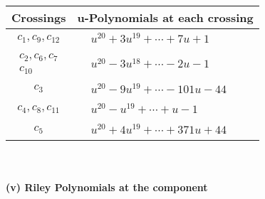 \documentclass[1p]{elsarticle_modified}
\theoremstyle{definition}
\begin{document}
\begin{tabular}{m{50pt}|m{274pt}}
Crossings & \hspace{64pt}u-Polynomials at each crossing \\
\hline $$\begin{aligned}c_{1},c_{9},c_{12}\end{aligned}$$&$\begin{aligned}
&u^{20}+3 u^{19}+\cdots+7 u+1
\end{aligned}$\\
\hline $$\begin{aligned}c_{2},c_{6},c_{7}\\c_{10}\end{aligned}$$&$\begin{aligned}
&u^{20}-3 u^{18}+\cdots-2 u-1
\end{aligned}$\\
\hline $$\begin{aligned}c_{3}\end{aligned}$$&$\begin{aligned}
&u^{20}-9 u^{19}+\cdots-101 u-44
\end{aligned}$\\
\hline $$\begin{aligned}c_{4},c_{8},c_{11}\end{aligned}$$&$\begin{aligned}
&u^{20}- u^{19}+\cdots+u-1
\end{aligned}$\\
\hline $$\begin{aligned}c_{5}\end{aligned}$$&$\begin{aligned}
&u^{20}+4 u^{19}+\cdots+371 u+44
\end{aligned}$\\
\hline
\end{tabular}\\~\\
\newpage\renewcommand{\arraystretch}{1}
\flushleft \textbf{(v) Riley Polynomials at the component}\newline \\
\end{document}
